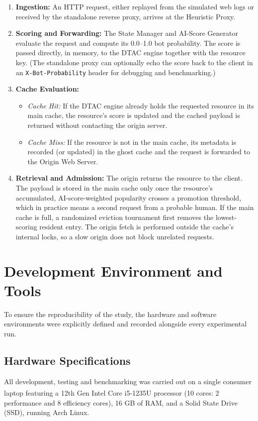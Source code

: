\begin{enumerate}
    \item \textbf{Ingestion:} An HTTP request, either replayed from the simulated web logs or received by the standalone reverse proxy, arrives at the Heuristic Proxy.
    \item \textbf{Scoring and Forwarding:} The State Manager and AI-Score Generator evaluate the request and compute its 0.0--1.0 bot probability. The score is passed directly, in memory, to the DTAC engine together with the resource key. (The standalone proxy can optionally echo the score back to the client in an \texttt{X-Bot-Probability} header for debugging and benchmarking.)
    \item \textbf{Cache Evaluation:}
    \begin{itemize}
        \item \textit{Cache Hit:} If the DTAC engine already holds the requested resource in its main cache, the resource's score is updated and the cached payload is returned without contacting the origin server.
        \item \textit{Cache Miss:} If the resource is not in the main cache, its metadata is recorded (or updated) in the ghost cache and the request is forwarded to the Origin Web Server.
    \end{itemize}
    \item \textbf{Retrieval and Admission:} The origin returns the resource to the client. The payload is stored in the main cache only once the resource's accumulated, AI-score-weighted popularity crosses a promotion threshold, which in practice means a second request from a probable human. If the main cache is full, a randomized eviction tournament first removes the lowest-scoring resident entry. The origin fetch is performed outside the cache's internal locks, so a slow origin does not block unrelated requests.
\end{enumerate}

\section{Development Environment and Tools}
To ensure the reproducibility of the study, the hardware and software environments were explicitly defined and recorded alongside every experimental run.

\subsection{Hardware Specifications}
All development, testing and benchmarking was carried out on a single consumer laptop featuring a 12th Gen Intel\textsuperscript{\textregistered} Core\textsuperscript{\texttrademark} i5-1235U processor (10 cores: 2 performance and 8 efficiency cores), 16 GB of RAM, and a Solid State Drive (SSD), running Arch Linux.

